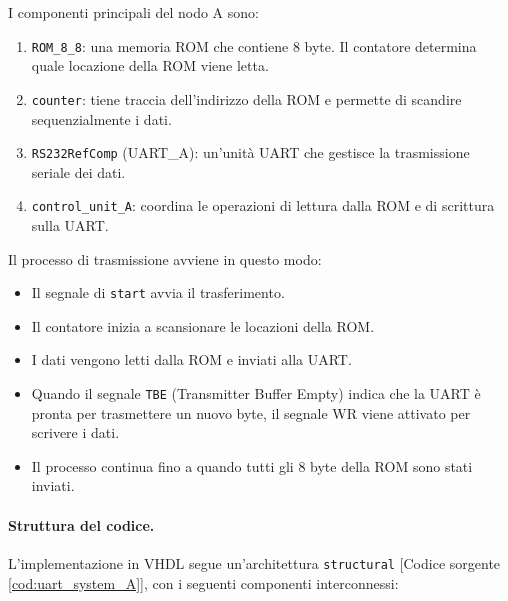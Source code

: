 I componenti principali del nodo A sono:

\begin{enumerate}
    \item \texttt{ROM\_8\_8}: una memoria ROM che contiene 8 byte. Il contatore determina quale locazione della ROM viene letta.
    \item \texttt{counter}: tiene traccia dell'indirizzo della ROM e permette di scandire sequenzialmente i dati.
    \item \texttt{RS232RefComp} (UART\_A): un'unità UART che gestisce la trasmissione seriale dei dati.
    \item \texttt{control\_unit\_A}: coordina le operazioni di lettura dalla ROM e di scrittura sulla UART.
\end{enumerate}

Il processo di trasmissione avviene in questo modo:

\begin{itemize}
    \item Il segnale di \texttt{start} avvia il trasferimento.
    \item Il contatore inizia a scansionare le locazioni della ROM.
    \item I dati vengono letti dalla ROM e inviati alla UART.
    \item Quando il segnale \texttt{TBE} (Transmitter Buffer Empty) indica che la UART è pronta per trasmettere un nuovo byte, il segnale WR viene attivato per scrivere i dati.
    \item Il processo continua fino a quando tutti gli 8 byte della ROM sono stati inviati.
\end{itemize}

\paragraph{Struttura del codice.}
L'implementazione in VHDL segue un'architettura \texttt{structural} [Codice sorgente \ref{cod:uart_system_A}], con i seguenti componenti interconnessi:


